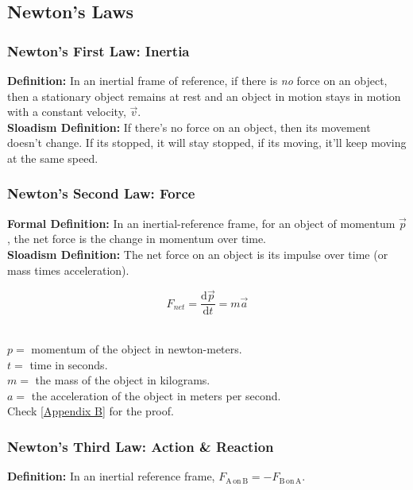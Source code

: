 \documentclass{article}
\begin{document}
\subsection{Newton's Laws}
\subsubsection{Newton's First Law: Inertia}
\textbf{Definition:} In an inertial frame of reference, if there is \textit{no} force on an object, then a stationary object remains at rest and an object in motion stays in motion with a constant velocity, $\vec{v}$. \\

\noindent \textbf{Sloadism Definition:} If there's no force on an object, then its movement doesn't change. If its stopped, it will stay stopped, if its moving, it'll keep moving at the same speed. \\

\subsubsection{Newton's Second Law: Force}
\textbf{Formal Definition:} In an inertial-reference frame, for an object of momentum $\vec{p}$, the net force is the change in momentum over time. \\

\noindent \textbf{Sloadism Definition:} The net force on an object is its impulse over time (or mass times acceleration).

\begin{equation}
    F_{net} = \frac{\mathrm{d}\vec{p}}{\mathrm{d}t} = m\vec{a}
\end{equation} %

 \\
$p = $ momentum of the object in newton-meters. \\
$t = $ time in seconds. \\
$m = $ the mass of the object in kilograms. \\
$a = $ the acceleration of the object in meters per second. \\

\noindent Check \ref{Appendix B} for the proof.

\subsubsection{Newton's Third Law: Action \& Reaction}
\textbf{Definition:} In an inertial reference frame, $F_{\mathrm{A \, on \, B}} = -F_{\mathrm{B \, on \, A}}$. \\
\end{document}

